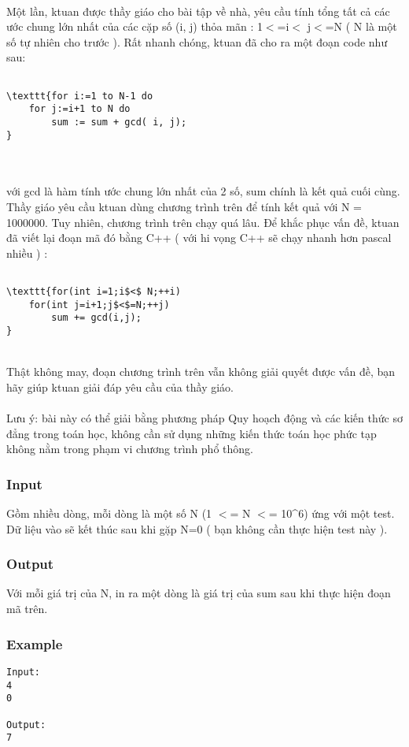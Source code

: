 

 

Một lần, ktuan được thầy giáo cho bài tập về nhà, yêu cầu tính tổng tất cả các ước chung lớn nhất của các cặp số (i, j) thỏa mãn : 1$<$=i$<$ j$<$=N ( N là một số tự nhiên cho trước ). Rất nhanh chóng, ktuan đã cho ra một đoạn code như sau:
\begin{verbatim}

\texttt{for i:=1 to N-1 do
    for j:=i+1 to N do
        sum := sum + gcd( i, j);
}\end{verbatim}


\\
\\với gcd là hàm tính ước chung lớn nhất của 2 số, sum chính là kết quả cuối cùng.
\\Thầy giáo yêu cầu ktuan dùng chương trình trên để tính kết quả với N = 1000000. Tuy nhiên, chương trình trên chạy quá lâu. Để khắc phục vấn đề, ktuan đã viết lại đoạn mã đó bằng C++ ( với hi vọng C++ sẽ chạy nhanh hơn pascal nhiều ) :
\begin{verbatim}

\texttt{for(int i=1;i$<$ N;++i)
    for(int j=i+1;j$<$=N;++j)
        sum += gcd(i,j);
}\end{verbatim}


\\Thật không may, đoạn chương trình trên vẫn không giải quyết được vấn đề, bạn hãy giúp ktuan giải đáp yêu cầu của thầy giáo.
\\
\\Lưu ý: bài này có thể giải bằng phương pháp Quy hoạch động và các kiến thức sơ đẳng trong toán học, không cần sử dụng những kiến thức toán học phức tạp không nằm trong phạm vi chương trình phổ thông.

\subsubsection{Input}

Gồm nhiều dòng, mỗi dòng là một số N (1 $<$= N $<$= 10\textasciicircum6) ứng với một test. Dữ liệu vào sẽ kết thúc sau khi gặp N=0 ( bạn không cần thực hiện test này ).

\subsubsection{Output}

Với mỗi giá trị của N, in ra một dòng là giá trị của sum sau khi thực hiện đoạn mã trên.

\subsubsection{Example}
\begin{verbatim}
Input:
4
0

Output:
7
\end{verbatim}